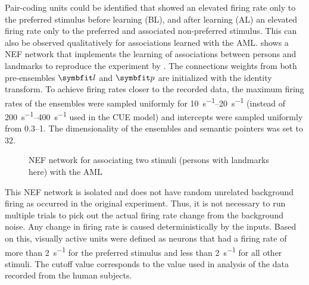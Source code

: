 Pair-coding units could be identified that showed an elevated firing rate only to the preferred stimulus before learning (BL), and after learning (AL) an elevated firing rate only to the preferred and associated non-preferred stimulus.
This can also be observed qualitatively for associations learned with the AML\@.
 shows a NEF network that implements the learning of associations between persons and landmarks to reproduce the experiment by \textcite{ison2015}.
The connections weights from both pre-ensembles $\vc l$ and $\vc p$ are initialized with the identity transform.
To achieve firing rates closer to the recorded data, the maximum firing rates of the ensembles were sampled uniformly for \SIrange{10}{20}{\second^{-1}} (instead of \SIrange{200}{400}{\second^{-1}} used in the CUE model) and intercepts were sampled uniformly from \numrange{0.3}{1}.
The dimensionality of the ensembles and semantic pointers was set to \num{32}.
\begin{figure}
    \centering
    \caption{NEF network for associating two stimuli (persons with landmarks here) with the AML}\label{fig:aml-net}
\end{figure}

This NEF network is isolated and does not have random unrelated background firing as occurred in the original experiment.
Thus, it is not necessary to run multiple trials to pick out the actual firing rate change from the background noise.
Any change in firing rate is caused deterministically by the inputs.
Based on this, visually active units were defined as neurons that had a firing rate of more than \SI{2}{\second^{-1}} for the preferred stimulus and less than \SI{2}{\second^{-1}} for all other stimuli.
The cutoff value corresponds to the value used in analysis of the data recorded from the human subjects.

